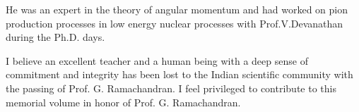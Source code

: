 He was an expert in the theory of angular momentum and had worked on pion production processes in low energy nuclear processes with Prof.V.Devanathan during the Ph.D. days. 

I believe an excellent teacher and a human being with a deep sense of commitment and integrity has been lost to the Indian scientific community with the passing of Prof. G. Ramachandran. I feel privileged to contribute to this memorial volume in honor of Prof. G. Ramachandran.




